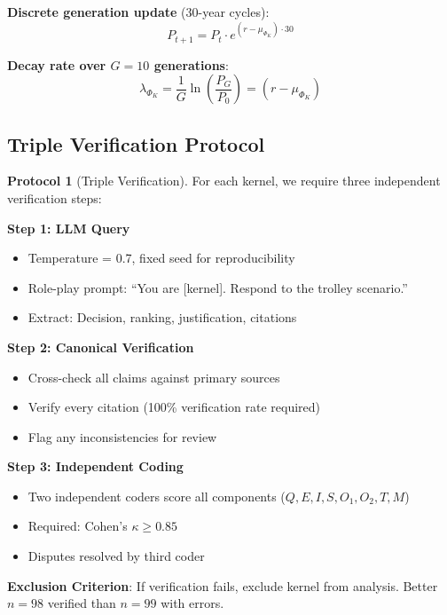 \documentclass[11pt,a4paper]{article}
\theoremstyle{definition}
\newtheorem{protocol}[theorem]{Protocol}
\theoremstyle{remark}
\begin{document}
\textbf{Discrete generation update} (30-year cycles):
\begin{equation}
    P_{t+1} = P_t \cdot e^{(r - \mu_{\Phi_K}) \cdot 30}
    \label{eq:discrete-update}
\end{equation}

\textbf{Decay rate over $G = 10$ generations}:
\begin{equation}
    \lambda_{\Phi_K} = \frac{1}{G} \ln\left(\frac{P_G}{P_0}\right) = (r - \mu_{\Phi_K})
    \label{eq:decay-rate}
\end{equation}

\subsection{Triple Verification Protocol}

\begin{protocol}[Triple Verification]
\label{protocol:verification}
For each kernel, we require three independent verification steps:
\end{protocol}

\textbf{Step 1: LLM Query}
\begin{itemize}
    \item Temperature = 0.7, fixed seed for reproducibility
    \item Role-play prompt: ``You are [kernel]. Respond to the trolley scenario.''
    \item Extract: Decision, ranking, justification, citations
\end{itemize}

\textbf{Step 2: Canonical Verification}
\begin{itemize}
    \item Cross-check all claims against primary sources
    \item Verify every citation (100\% verification rate required)
    \item Flag any inconsistencies for review
\end{itemize}

\textbf{Step 3: Independent Coding}
\begin{itemize}
    \item Two independent coders score all components ($Q, E, I, S, O_1, O_2, T, M$)
    \item Required: Cohen's $\kappa \geq 0.85$
    \item Disputes resolved by third coder
\end{itemize}

\textbf{Exclusion Criterion}: If verification fails, exclude kernel from analysis. Better $n = 98$ verified than $n = 99$ with errors.
\end{document}
